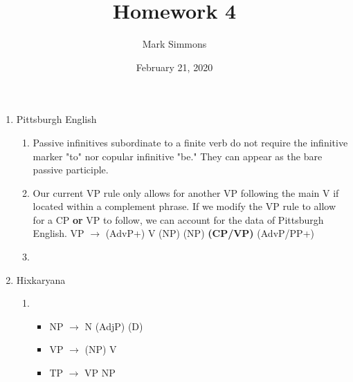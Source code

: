 \documentclass[12pt]{article}
\title{Homework 4}
\author{Mark Simmons}
\date{February 21, 2020}
\begin{document}
\maketitle

\begin{enumerate}

\item Pittsburgh English

\begin{enumerate}

\item Passive infinitives subordinate to a finite verb do not require the infinitive marker "to" nor copular infinitive "be." They can appear as the bare passive participle.

\item Our current VP rule only allows for another VP following the main V if located within a complement phrase. If we modify the VP rule to allow for a CP \textbf{or} VP to follow, we can account for the data of Pittsburgh English.
VP $\rightarrow$ (AdvP+) V (NP) (NP) \textbf{(CP/VP)} ({AdvP/PP}+)

\item \leavevmode\vadjust{\vspace{-\baselineskip}}\newline
{}

\end{enumerate}

\item Hixkaryana

\begin{enumerate}

\item 

\begin{itemize}

\item NP $\rightarrow$ N (AdjP) (D)
\item VP $\rightarrow$ (NP) V
\item TP $\rightarrow$ VP NP

\end{itemize}


\end{enumerate}
\end{enumerate}
\end{document}
